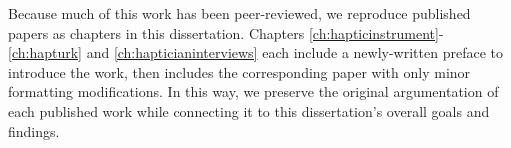 Because much of this work has been peer-reviewed, we reproduce published papers as chapters in this dissertation.
Chapters \ref{ch:hapticinstrument}-\ref{ch:hapturk} and \ref{ch:hapticianinterviews} each include a newly-written preface to introduce the work, then includes the corresponding paper with only minor formatting modifications.
In this way, we preserve the original argumentation of each published work while connecting it to this dissertation's overall goals and findings.




%
%
%	
%
